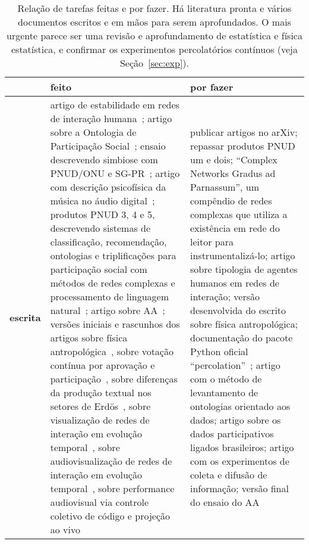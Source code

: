 \documentclass[a4paper,openright,12pt]{report} %
\begin{document}
\begin{table}[h]
\centering
\footnotesize
\caption{ \footnotesize Relação de tarefas feitas e por fazer. Há literatura pronta e vários documentos escritos e em mãos para serem aprofundados. O mais urgente parece ser uma revisão e aprofundamento de estatística
e física estatística, e confirmar os experimentos percolatórios contínuos (veja Seção~\ref{sec:exp}).}\label{tab:afa}
\begin{tabular}{p{1.3cm}||p{7.6cm}|p{7.1cm}}\hline
    & {\bf feito} & {\bf por fazer} \\\hline
    {\bf escrita}      & artigo de estabilidade em redes de interação humana~\cite{timeS};
    artigo sobre a Ontologia de Participação Social~\cite{ops};
    ensaio descrevendo simbiose com PNUD/ONU e SG-PR~\cite{ensaio};
    artigo com descrição psicofísica da música no áudio digital~\cite{mass};
    produtos PNUD 3, 4 e 5, descrevendo sistemas de classificação, recomendação, ontologias e triplificações para participação social com métodos de redes complexas e processamento de linguagem natural~\cite{pnud3,pnud4,pnud5};
    artigo sobre AA~\cite{paaper}; 
    versões iniciais e rascunhos dos artigos sobre física antropológica~\cite{anPhy},
    sobre votação contínua por aprovação e participação~\cite{continuousV},
    sobre diferenças da produção textual nos setores de Erdös~\cite{rcText},
    sobre visualização de redes de interação em evolução temporal~\cite{versinus},
    sobre audiovisualização de redes de interação em evolução temporal~\cite{versinus},
    sobre performance audiovisual via controle coletivo de código e projeção ao vivo~\cite{vivace}
    & publicar artigos no arXiv; repassar produtos PNUD um e dois;
    ``Complex Networks Gradus ad Parnassum'', um compêndio de redes complexas que utiliza a existência
    em rede do leitor para instrumentalizá-lo;
    artigo sobre tipologia de agentes humanos em redes de interação;
    versão desenvolvida do escrito sobre física antropológica;
    documentação do pacote Python oficial ``percolation''~\cite{percolation};
    artigo com o método de levantamento de ontologias orientado aos dados;
    artigo sobre os dados participativos ligados brasileiros;
    artigo com os experimentos de coleta e difusão de informação;
    versão final do ensaio do AA~\cite{ensaaio}\\\hline

\end{tabular}
\end{table}
\end{document}
